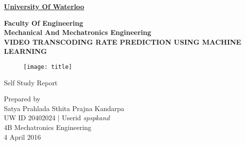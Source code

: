 \pagestyle{empty}

\begin{titlepage}
        \begin{center}

        \Large
        {\bf \sc \underline{University Of Waterloo}}
        
        \normalsize
        {\bf \sc Faculty Of Engineering \\
        Mechanical And Mechatronics Engineering} \\

        \vspace*{1.0cm}
        \Large
        {\bf \uppercase{Video Transcoding Rate Prediction using machine learning}}
        
        \vspace*{1.5cm}
        \normalsize
        \begin{figure}[h!]
        \centering
        \texttt{[image: title]}
        \label{fig:tit}
        \end{figure}
        
        \vfill
        {\sc Self Study Report}

        \vspace*{1cm}
        Prepared by\\
        {\sc Satya Prahlada Sthita Prajna Kandarpa \\
        UW ID 20402024 $\vert$ Userid \textit{spspkand} \\ 
        4B Mechatronics Engineering \\
        4 April 2016}

        \end{center}
\end{titlepage}



\cleardoublepage %

